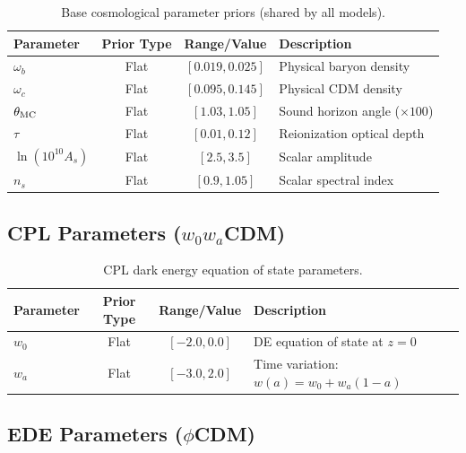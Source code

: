 \documentclass[a4paper,11pt]{article}
\begin{document}
\begin{table}[h]
\centering
\caption{Base cosmological parameter priors (shared by all models).}
\label{tab:base_priors}
\begin{tabular}{lccl}
\toprule
Parameter & Prior Type & Range/Value & Description \\
\midrule
$\omega_b$ & Flat & $[0.019, 0.025]$ & Physical baryon density \\
$\omega_c$ & Flat & $[0.095, 0.145]$ & Physical CDM density \\
$\theta_{\rm MC}$ & Flat & $[1.03, 1.05]$ & Sound horizon angle ($\times 100$) \\
$\tau$ & Flat & $[0.01, 0.12]$ & Reionization optical depth \\
$\ln(10^{10}A_s)$ & Flat & $[2.5, 3.5]$ & Scalar amplitude \\
$n_s$ & Flat & $[0.9, 1.05]$ & Scalar spectral index \\
\bottomrule
\end{tabular}
\end{table}

\subsection{CPL Parameters ($w_0w_a$CDM)}

\begin{table}[h]
\centering
\caption{CPL dark energy equation of state parameters.}
\label{tab:cpl_priors}
\begin{tabular}{lccl}
\toprule
Parameter & Prior Type & Range/Value & Description \\
\midrule
$w_0$ & Flat & $[-2.0, 0.0]$ & DE equation of state at $z=0$ \\
$w_a$ & Flat & $[-3.0, 2.0]$ & Time variation: $w(a) = w_0 + w_a(1-a)$ \\
\bottomrule
\end{tabular}
\end{table}

\subsection{EDE Parameters ($\phi$CDM)}
\end{document}
